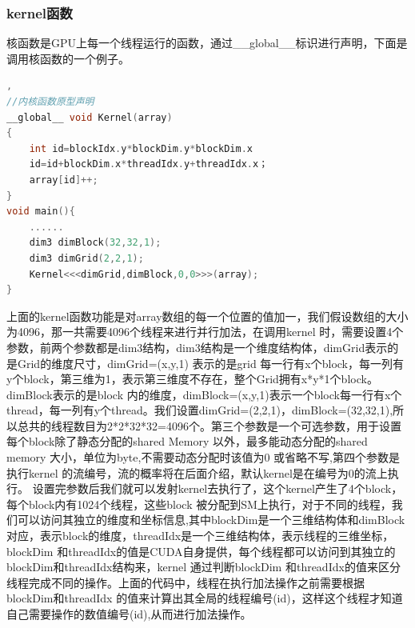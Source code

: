 \subsubsection{kernel函数}
核函数是GPU上每一个线程运行的函数，通过\_\_global\_\_标识进行声明，下面是调用核函数的一个例子。
\begin{lstlisting}[language=C],
//内核函数原型声明
__global__ void Kernel(array)
{
    int id=blockIdx.y*blockDim.y*blockDim.x
    id=id+blockDim.x*threadIdx.y+threadIdx.x；
    array[id]++;
}
void main(){
    ......
    dim3 dimBlock(32,32,1);
    dim3 dimGrid(2,2,1);
    Kernel<<<dimGrid,dimBlock,0,0>>>(array);
}
\end{lstlisting}
上面的kernel函数功能是对array数组的每一个位置的值加一，我们假设数组的大小为4096，那一共需要4096个线程来进行并行加法，在调用kernel 时，需要设置4个参数，前两个参数都是dim3结构，dim3结构是一个维度结构体，dimGrid表示的是Grid的维度尺寸，dimGrid=(x,y,1) 表示的是grid 每一行有x个block，每一列有y个block，第三维为1，表示第三维度不存在，整个Grid拥有x*y*1个block。dimBlock表示的是block 内的维度，dimBlock=(x,y,1)表示一个block每一行有x个thread，每一列有y个thread。我们设置dimGrid=(2,2,1)，dimBlock=(32,32,1),所以总共的线程数目为2*2*32*32=4096个。第三个参数是一个可选参数，用于设置每个block除了静态分配的shared Memory 以外，最多能动态分配的shared memory 大小，单位为byte,不需要动态分配时该值为0 或省略不写,第四个参数是执行kernel 的流编号，流的概率将在后面介绍，默认kernel是在编号为0的流上执行。\newline
设置完参数后我们就可以发射kernel去执行了，这个kernel产生了4个block，每个block内有1024个线程，这些block 被分配到SM上执行，对于不同的线程，我们可以访问其独立的维度和坐标信息,其中blockDim是一个三维结构体和dimBlock对应，表示block的维度，threadIdx是一个三维结构体，表示线程的三维坐标，blockDim 和threadIdx的值是CUDA自身提供，每个线程都可以访问到其独立的blockDim和threadIdx结构来，kernel 通过判断blockDim 和threadIdx的值来区分线程完成不同的操作。上面的代码中，线程在执行加法操作之前需要根据blockDim和threadIdx 的值来计算出其全局的线程编号(id)，这样这个线程才知道自己需要操作的数值编号(id),从而进行加法操作。\newline
